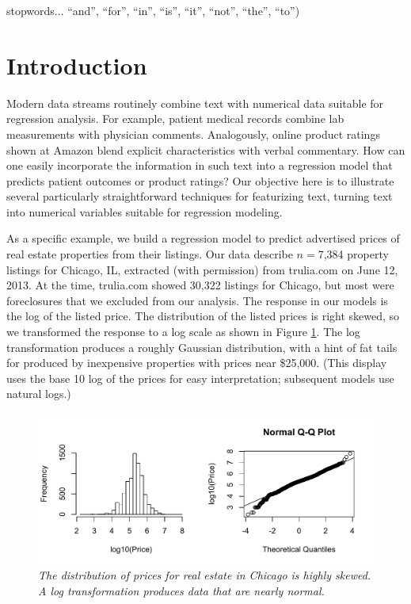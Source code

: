 \documentclass[10pt]{article}
\begin{document}
 stopwords... ``and'', ``for'', ``in'', ``is'', ``it'', ``not'', ``the'', ``to'')
 
 
 \clearpage


\section{Introduction}
\label{sec:intro}

 Modern data streams routinely combine text with numerical data suitable for
 regression analysis.  For example, patient medical records combine lab
 measurements with physician comments.  Analogously, online product ratings
 shown at Amazon blend explicit characteristics with verbal commentary.  How can
 one easily incorporate the information in such text into a regression model
 that predicts patient outcomes or product ratings?  Our objective here is to
 illustrate several particularly straightforward techniques for featurizing
 text, turning text into numerical variables suitable for regression modeling.
 
 
 As a specific example, we build a regression model to predict advertised prices
 of real estate properties from their listings.  Our data describe $n=$7,384
 property listings for Chicago, IL, extracted (with permission) from trulia.com
 on June 12, 2013.  At the time, trulia.com showed 30,322 listings for Chicago,
 but most were foreclosures that we excluded from our analysis.  The response in
 our models is the log of the listed price.  The distribution of the listed
 prices is right skewed, so we transformed the response to a log scale as shown
 in Figure \ref{fig:prices}.  The log transformation produces a roughly Gaussian
 distribution, with a hint of fat tails for produced by inexpensive properties
 with prices near \$25,000.  (This display uses the base 10 log of the prices
 for easy interpretation; subsequent models use natural logs.)
 
 
 \begin{figure}
 \caption{ \label{fig:prices} { \sl The distribution of prices for real estate
 in Chicago is highly skewed.  A log transformation produces data that are
 nearly normal.}  }
 \centerline{
 \vspace{0.1in}
 \includegraphics[width=5in]{figures/prices} }
 \vspace{0.2in}
 \end{figure}
\end{document}

